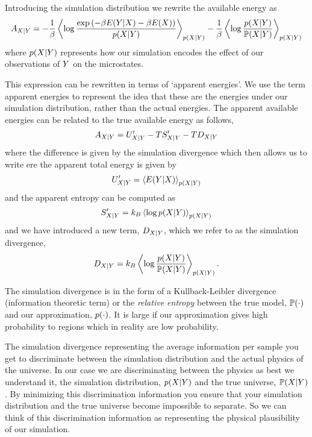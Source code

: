 \documentclass[]{article}
\begin{document}
Introducing the simulation distribution we rewrite the available energy as
\[
A_{X|Y} =  -\frac{1}{\beta}\left\langle \log \frac{\exp\left(-\beta E(Y|X) -\beta E(X)\right)}{p(X|Y) } \right\rangle_{p(X|Y) } - \frac{1}{\beta}\left\langle \log \frac{p(X|Y)}{\mathbb{P}(X|Y) } \right\rangle_{p(X|Y) }
\] 
where \(p(X|Y)\) represents how our simulation encodes the effect of our  observations of \(Y\) on the microstates.

This expression can be rewritten in terms of `apparent energies'. We use the term apparent energies to represent the idea that these are the energies under our simulation distribution, rather than the actual energies. The apparent available energies can be related to the true available energy as follows, 
\[
A_{X|Y} = U^\prime_{X|Y} - TS^\prime_{X|Y} - TD_{X|Y}
\] 
where the difference is given by the simulation divergence
which then allows us to write ere the apparent total energy is given by 
\[
U^\prime_{X|Y} = \left\langle E(Y|X) \right\rangle_{p(X|Y) } 
\] and the apparent entropy can be computed as \[
S^\prime_{X|Y}=k_B\left\langle \log p(X|Y)  \right\rangle_{p(X|Y) }
\] and we have introduced a new term,
\(D_{X|Y}\), which we refer to as the simulation
divergence, 
\[
D_{X|Y} = k_B \left\langle \log \frac{p(X| Y)}{\mathbb{P}(X|Y) } \right\rangle_{p(X|Y) }.
\]

The simulation divergence is in the form of a Kullback-Leibler
divergence (information theoretic term) or the \emph{relative entropy}
between the true model, \(\mathbb{P}(\cdot)\) and our approximation,
\(p(\cdot)\). It is large if our approximation gives high
probability to regions which in reality are low probability.

The simulation divergence representing the average information per sample you get to discriminate between the simulation distribution and the actual physics of the universe. In our case we are discriminating between the physics as best we understand it, the simulation distribution, $p(X|Y)$ and the true universe, $\mathbb{P}(X | Y)$. By minimizing this discrimination information you ensure that your simulation distribution and the true universe become impossible to separate. So we can think of this discrimination information as representing the physical plausibility of our simulation. 
\end{document}
